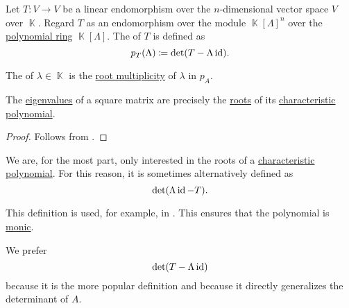 \begin{definition}\label{def:characteristic_polynomial}\mimprovised
  Let \( T: V \to V \) be a linear endomorphism over the \( n \)-dimensional vector space \( V \) over \( \BbbK \). Regard \( T \) as an endomorphism over the module \( \BbbK[\Lambda]^n \) over the \hyperref[def:polynomial_algebra]{polynomial ring} \( \BbbK[\Lambda] \). The  of \( T \) is defined as
  \begin{equation*}
    p_T(\Lambda) \coloneqq \det(T - \Lambda \operatorname{id}).
  \end{equation*}

  The  of \( \lambda \in \BbbK \) is the \hyperref[def:polynomial_root]{root multiplicity} of \( \lambda \) in \( p_A \).
\end{definition}

\begin{proposition}\label{thm:eigenvalues_and_characteristic_polynomials}
  The \hyperref[def:eigenpair]{eigenvalues} of a square matrix are precisely the \hyperref[def:polynomial_root]{roots} of its \hyperref[def:characteristic_polynomial]{characteristic polynomial}.
\end{proposition}
\begin{proof}
  Follows from .
\end{proof}

\begin{remark}\label{rem:characteristic_polynomial}
  We are, for the most part, only interested in the roots of a \hyperref[def:characteristic_polynomial]{characteristic polynomial}. For this reason, it is sometimes alternatively defined as
  \begin{equation*}
    \det(\Lambda \operatorname{id} - T).
  \end{equation*}

  This definition is used, for example, in \cite[74]{Knapp2016BasicAlgebra}. This ensures that the polynomial is \hyperref[def:monic_polynomial]{monic}.

  We prefer
  \begin{equation*}
    \det(T - \Lambda \operatorname{id})
  \end{equation*}
  because it is the more popular definition and because it directly generalizes the determinant of \( A \).
\end{remark}

